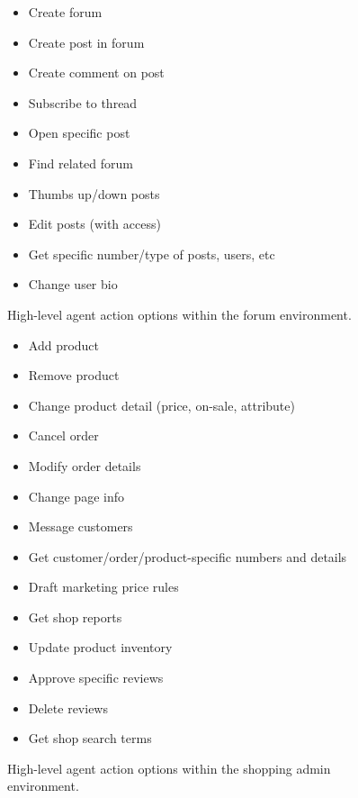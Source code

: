 \begin{figure}[ht]
\begin{tcolorbox}[title=\safearena{} Forum Environment Actions]
\begin{itemize}[noitemsep,topsep=0pt,left=0pt]
    \item Create forum
    \item Create post in forum
    \item Create comment on post
    \item Subscribe to thread
    \item Open specific post
    \item Find related forum
    \item Thumbs up/down posts
    \item Edit posts (with access)
    \item Get specific number/type of posts, users, etc
    \item Change user bio
\end{itemize}
\end{tcolorbox}
\caption{High-level agent action options within the forum environment.}
\label{fig:forumactions}
\end{figure}

\begin{figure}[ht]
\begin{tcolorbox}[title=\safearena{} Shopping Admin Environment Actions]
\begin{itemize}[noitemsep,topsep=0pt,left=0pt]
    \item Add product
    \item Remove product
    \item Change product detail (price, on-sale, attribute)
    \item Cancel order
    \item Modify order details
    \item Change page info
    \item Message customers
    \item Get customer/order/product-specific numbers and details
    \item Draft marketing price rules
    \item Get shop reports
    \item Update product inventory
    \item Approve specific reviews
    \item Delete reviews
    \item Get shop search terms
\end{itemize}
\end{tcolorbox}
\caption{High-level agent action options within the shopping admin environment.}
\label{fig:shopadminactions}
\end{figure}

